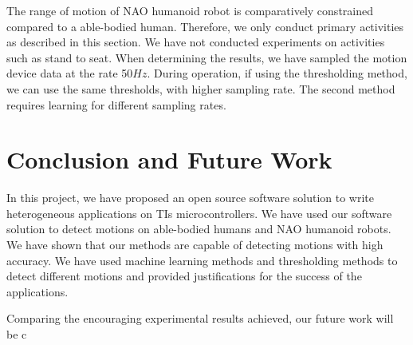 \documentclass[letterpaper]{article}
\begin{document}
The range of motion of NAO humanoid robot is comparatively constrained compared to a able-bodied 
human. Therefore, we only conduct primary activities as described in this section. We have not 
conducted experiments on activities such as stand to seat. When determining the results, we 
have sampled the motion device data at the rate 50$Hz$. During operation, if using the 
thresholding method, we can use the same thresholds, with higher sampling rate. The second method 
requires learning for different sampling rates. 





\section{Conclusion and Future Work}

In this project, we have proposed an open source software solution to write heterogeneous
applications on TIs microcontrollers. We have used our software solution to detect motions on
able-bodied humans and NAO humanoid robots. We have shown that our methods are capable of detecting
motions with high accuracy. We have used machine learning methods and thresholding methods to
detect different motions and provided justifications for the success of the applications. 

\par
Comparing the encouraging experimental results achieved, our future work will be c



\end{document}
